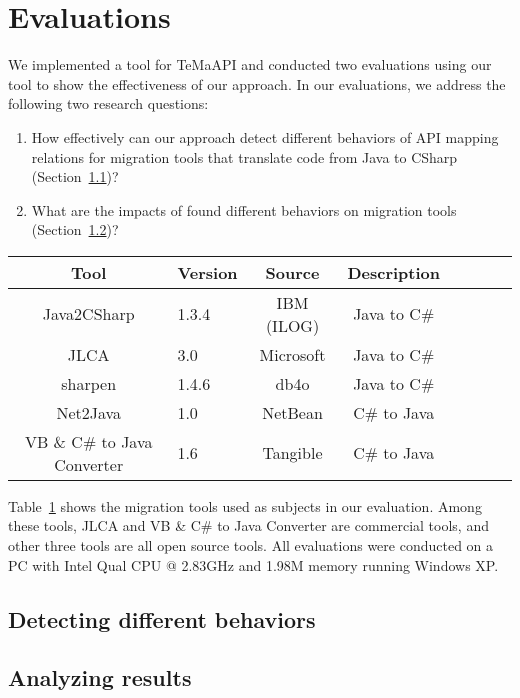 \section{Evaluations}
\label{sec:evaluation}

We implemented a tool for TeMaAPI and
conducted two evaluations using our tool to show the effectiveness
of our approach. In our evaluations, we address the following
two research questions:

\begin{enumerate}
\item How effectively can our approach detect different behaviors of API mapping relations for migration tools that translate code from Java to CSharp (Section~\ref{sec:evaluation:behavior})? \vspace*{-1.8ex}
\item What are the impacts of found different behaviors on migration tools (Section~\ref{sec:evaluation:result})? %
\end{enumerate}%

\begin{table}[t]
\centering
\begin{SmallOut}
\begin {tabular} {|c|l|c|c|c|c|c|c|}
 \hline
\textbf{Tool}& \textbf{Version}& \textbf{Source} &\textbf{Description}\\
\hline
Java2CSharp  &  1.3.4 & IBM (ILOG) & Java to C\# \\
\hline
JLCA         &  3.0   & Microsoft  & Java to C\# \\
\hline
sharpen      &  1.4.6 & db4o       & Java to C\# \\
\hline
Net2Java     &  1.0   & NetBean    &  C\# to Java\\
\hline
VB \& C\# to Java Converter    &  1.6   & Tangible   &  C\# to Java\\
\hline
\end{tabular}\vspace*{-2ex}
 \label{table:subjects}
\end{SmallOut}\vspace*{-2ex}
\end{table}

Table~\ref{table:subjects} shows the migration tools used as subjects in our evaluation. Among these tools, JLCA and VB \& C\# to Java Converter are commercial tools, and other three tools are all open source tools. All evaluations were conducted on a PC with Intel Qual CPU @
2.83GHz and 1.98M memory running Windows XP.

\subsection{Detecting different behaviors}
\label{sec:evaluation:behavior}
\subsection{Analyzing results}
\label{sec:evaluation:result}

